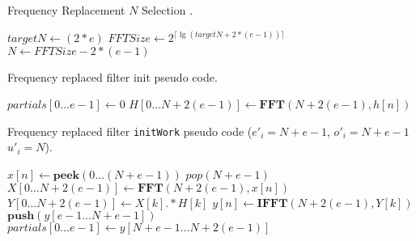 \begin{algorithm}
\caption{Frequency Replacement $N$ Selection .\label{alg:freq-size}}
\begin{algorithmic}
\STATE $targetN \leftarrow (2*e)$
\STATE $FFTSize \leftarrow 2^{\lceil \lg(targetN + 2*(e-1)) \rceil}$
\STATE $N \leftarrow FFTSize - 2*(e-1)$ 
\end{algorithmic}
\end{algorithm}




\begin{algorithm}
  \caption{Frequency replaced filter init pseudo code.\label{alg:freq-init}}
  \begin{algorithmic}
    \STATE $partials[0 \dots e-1] \leftarrow 0$
    \STATE $H[0 \dots N+2(e-1)] \leftarrow \mathbf{FFT}(N+2(e-1),h[n])$
  \end{algorithmic}
\end{algorithm}

\begin{algorithm}
  \caption{Frequency replaced filter {\tt initWork} pseudo code 
  ($e'_{i}=N+e-1$, $o'_{i}=N+e-1$ $u'_{i}=N$).\label{alg:freq-init-work}}
  \begin{algorithmic}
    \STATE $x[n] \leftarrow \mathbf{peek}(0 \dots (N+e-1))$
    \STATE $pop(N+e-1)$
    \STATE $X[0 \dots N+2(e-1)] \leftarrow \mathbf{FFT} (N+2(e-1), x[n])$
    \STATE $Y[0 \dots N+2(e-1)] \leftarrow X[k] .* H[k]$
    \STATE $y[n] \leftarrow \mathbf{IFFT}(N+2(e-1), Y[k])$
    \STATE $\mathbf{push}(y[e-1 \dots N+e-1])$
    \STATE $partials[0 \dots e-1] \leftarrow y[N+e-1 \dots N+2(e-1)]$
  \end{algorithmic}
\end{algorithm}

